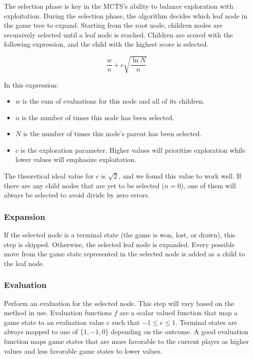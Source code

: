 \documentclass[10pt]{article}
\begin{document}
The selection phase is key in the MCTS's ability to balance exploration with exploitation. During the selection phase, the algorithm decides which leaf node in the game tree to expand. Starting from the root node, children nodes are recursively selected until a leaf node is reached. Children are scored with the following expression, and the child with the highest score is selected.\cite{wikipedia2025mcts}

\begin{equation}
    \frac{w}{n} + c \sqrt{ \frac{\ln N}{n} }
\end{equation}

In this expression:

\begin{itemize}
    \item $w$ is the sum of evaluations for this node and all of its children.
    \item $n$ is the number of times this node has been selected.
    \item $N$ is the number of times this node's parent has been selected. 
    \item $c$ is the exploration parameter. Higher values will prioritize exploration while lower values will emphasize exploitation.
\end{itemize}

The theoretical ideal value for $c$ is $\sqrt{2}$, and we found this value to work well. If there are any child nodes that are yet to be selected ($n = 0$), one of them will always be selected to avoid divide by zero errors.

\subsubsection{Expansion}

If the selected node is a terminal state (the game is won, lost, or drawn), this step is skipped. Otherwise, the selected leaf node is expanded. Every possible move from the game state represented in the selected node is added as a child to the leaf node.

\subsubsection{Evaluation}

Perform an evaluation for the selected node. This step will vary based on the method in use. Evaluation functions $f$ are a scalar valued function that map a game state to an evaluation value $e$ such that $-1 \leq e \leq 1$. Terminal states are always mapped to one of $\{1, -1, 0\}$ depending on the outcome. A good evaluation function maps game states that are more favorable to the current player as higher values and less favorable game states to lower values. 
\end{document}

